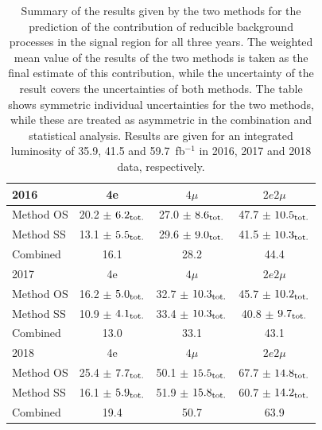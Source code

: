 \begin{table}[h]
   \centering
   \begin{tabular}{| l | c | c | c |} 
\hline
2016            & 4e                             & $4\mu$                          & $2e2\mu$       \\ 
\hline \hline
Method OS       & 20.2 $\pm$ $6.2_{\rm tot.}$    & 27.0 $\pm$ $8.6_{\rm tot.}$     & 47.7 $\pm$ $10.5_{\rm tot.}$    \\ 
Method SS       & 13.1 $\pm$ $5.5_{\rm tot.}$    & 29.6 $\pm$ $9.0_{\rm tot.}$     & 41.5 $\pm$ $10.3_{\rm tot.}$     \\   
Combined        & 16.1   & 28.2    & 44.4  \\  
\hline
2017            & 4e         & $4\mu$                      & $2e2\mu$       \\ 
\hline \hline
Method OS       & 16.2 $\pm$ $5.0_{\rm tot.}$    & 32.7 $\pm$ $10.3_{\rm tot.}$    & 45.7 $\pm$ $10.2_{\rm tot.}$    \\ 
Method SS       & 10.9 $\pm$ $4.1_{\rm tot.}$    & 33.4 $\pm$ $10.3_{\rm tot.}$    & 40.8 $\pm$ $9.7_{\rm tot.}$    \\   
Combined        & 13.0   & 33.1    & 43.1  \\  
\hline
2018            & 4e         & $4\mu$                      & $2e2\mu$       \\ 
\hline \hline
Method OS       & 25.4 $\pm$ $7.7_{\rm tot.}$    & 50.1 $\pm$ $15.5_{\rm tot.}$    & 67.7 $\pm$ $14.8_{\rm tot.}$    \\ 
Method SS       & 16.1 $\pm$ $5.9_{\rm tot.}$    & 51.9 $\pm$ $15.8_{\rm tot.}$    & 60.7 $\pm$ $14.2_{\rm tot.}$    \\   
Combined        & 19.4   & 50.7    & 63.9  \\  
\hline
 \end{tabular}
    \caption{
    Summary of the results given by the two methods for the prediction of the contribution of reducible background processes in the signal region for all three years. The weighted mean value of the results of the two methods is taken as the final estimate of this contribution, while the uncertainty of the result covers the uncertainties of both methods. The table shows symmetric individual uncertainties for the two methods, while these are treated as asymmetric in the combination and statistical analysis. Results are given for an integrated luminosity of 35.9, 41.5 and 59.7~fb$^{-1}$ in 2016, 2017 and 2018 data, respectively. 
    }
    \label{tab:reducibleSummary}
\end{table}


